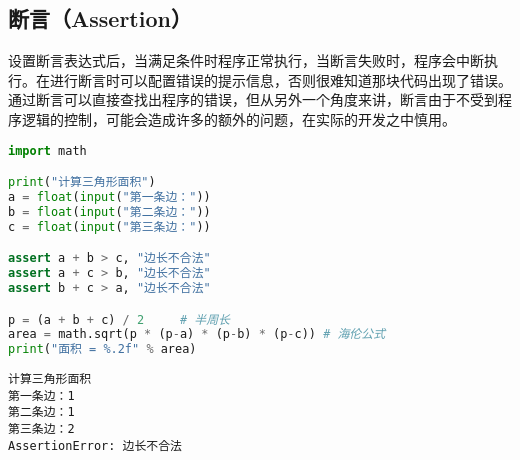 \subsection{断言（Assertion）}

设置断言表达式后，当满足条件时程序正常执行，当断言失败时，程序会中断执行。在进行断言时可以配置错误的提示信息，否则很难知道那块代码出现了错误。 \\

通过断言可以直接查找出程序的错误，但从另外一个角度来讲，断言由于不受到程序逻辑的控制，可能会造成许多的额外的问题，在实际的开发之中慎用。 \\


\begin{lstlisting}[language=Python]
import math

print("计算三角形面积")
a = float(input("第一条边："))
b = float(input("第二条边："))
c = float(input("第三条边："))

assert a + b > c, "边长不合法"
assert a + c > b, "边长不合法"
assert b + c > a, "边长不合法"

p = (a + b + c) / 2     # 半周长
area = math.sqrt(p * (p-a) * (p-b) * (p-c)) # 海伦公式
print("面积 = %.2f" % area)
\end{lstlisting}

\begin{tcolorbox}
    \begin{verbatim}
计算三角形面积
第一条边：1
第二条边：1
第三条边：2
AssertionError: 边长不合法
	\end{verbatim}
\end{tcolorbox}

\newpage